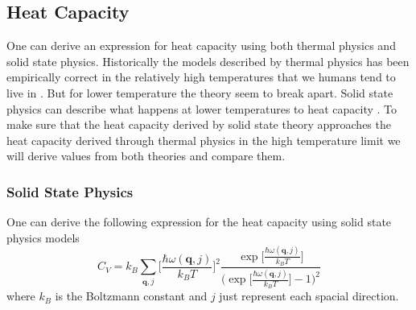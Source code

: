 \documentclass[11pt]{article}
\begin{document}
\subsection{Heat Capacity}
One can derive an expression for heat capacity using both thermal physics and solid state physics. Historically the models described by thermal physics has been empirically correct in the relatively high temperatures that we humans tend to live in \cite{bib:thermo}. But for lower temperature the theory seem to break apart. Solid state physics can describe what happens at lower temperatures to heat capacity \cite{bib:solid}. To make sure that the heat capacity derived by solid state theory approaches the heat capacity derived through thermal physics in the high temperature limit we will derive values from both theories and compare them.
\subsubsection{Solid State Physics}
One can derive the following expression for the heat capacity using solid state physics models\cite{bib:solid}
\begin{equation}
	C_V = k_B \sum_{\mathbf{q}, j} \Big[\frac{\hbar \omega(\mathbf{q},j)}{k_B T}\Big]^2
	\frac{\exp{\Big[\frac{\hbar \omega(\mathbf{q},j)}{k_B T}\Big]}}{\Big(\exp{\Big[\frac{\hbar \omega(\mathbf{q},j)}{k_B T}\Big]}-1\Big)^2}
	\label{eq:CV}
\end{equation}
where $k_B$ is the Boltzmann constant and $j$ just represent each spacial direction. 
\end{document}

